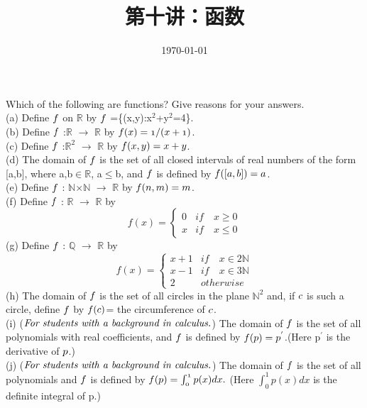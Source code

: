 \documentclass[11pt, a4paper, UTF8]{ctexart}
\title{第十讲：函数}
\date{\today}     %
\begin{document}
\maketitle
\noplagiarism	%
\beginthishw	%

\begin{problem}[UD:13.3]
Which of the following are functions? Give reasons for your answers.\\
(a) Define $\mathnormal{f}$ on $\mathbb{R}$ by $\mathnormal{f}$ =\{(x,y):x$^2$+y$^2$=4\}.\\
(b) Define $\mathnormal{f}$ :$\mathbb{R}$ $\rightarrow$ $\mathbb{R}$ by $\mathnormal{f(x)=1/(x+1)}$.\\
(c) Define $\mathnormal{f}$ :$\mathbb{R}^2$ $\rightarrow$ $\mathbb{R}$ by $\mathnormal{f(x,y)=x+y}$.\\
(d) The domain of $\mathnormal{f}$ is the set of all closed intervals of real numbers of the form [a,b], where a,b$\in$$\mathbb{R}$, a$\le$b, and $\mathnormal{f}$ is defined by $\mathnormal{f([a,b])=a}$.\\
(e) Define $\mathnormal{f}$ : $\mathbb{N}$$\times$$\mathbb{N}$ $\rightarrow$ $\mathbb{R}$ by $\mathnormal{f(n,m)=m}$.\\
(f) Define $\mathnormal{f}$ : $\mathbb{R}$ $\rightarrow$ $\mathbb{R}$ by\\
\[f(x)= \begin{cases}
0 & if\quad x\ge 0\\
x & if\quad x\le 0
\end{cases}\]
(g) Define $\mathnormal{f}$ : $\mathbb{Q}$ $\rightarrow$ $\mathbb{R}$ by\\
\[f(x)= \begin{cases}
x+1 & if\quad x\in 2\mathbb{N}\\
x-1 & if\quad x\in 3\mathbb{N}\\
2   & otherwise
\end{cases}\]
(h) The domain of $\mathnormal{f}$ is the set of all circles in the plane $\mathbb{N}^2$ and, if $\mathnormal{c}$ is such a circle, define $\mathnormal{f}$ by $\mathnormal{f(c)}$= the circumference of $\mathnormal{c}$.\\
(i) ($\emph{For students with a background in calculus.}$) The domain of $\mathnormal{f}$ is the set of all polynomials with real coefficients, and $\mathnormal{f}$ is defined by $\mathnormal{f(p)=p^{'}}$.(Here p$^{'}$ is the derivative of $\mathnormal{p}$.)\\
(j) ($\emph{For students with a background in calculus.}$) The domain of $\mathnormal{f}$ is the set of all polynomials and $\mathnormal{f}$ is defined by $\mathnormal{f(p)=\int_{0}^{1}p(x)dx.}$ (Here $\int_{0}^{1}p(x)dx$ is the definite integral of p.)

\end{problem}
\end{document}

